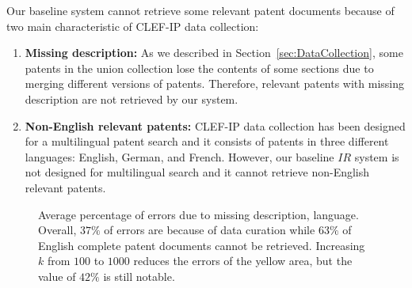 Our baseline system cannot retrieve some relevant patent documents because of two main characteristic of CLEF-IP data collection: 
\begin{enumerate}

\item \textbf{Missing description: } As we described in Section~\ref{sec:DataCollection}, some patents in the union collection lose the contents of some sections due to merging different versions of patents. Therefore, relevant patents with missing description are not retrieved by our system.
\item \textbf{Non-English relevant patents: } CLEF-IP data collection has been designed for a multilingual patent search and it consists of patents in three different languages: English, German, and French. However, our baseline $\mathit{IR}$ system is not designed for multilingual search and it cannot retrieve non-English relevant patents.   
\end{enumerate}
\begin{figure}[t!]
\begin{centering}
\par\end{centering} 
\protect\caption{Average percentage of errors due to missing description, language. Overall, $37\%$ of errors are because of data curation while $63\%$ of English complete patent documents cannot be retrieved. Increasing $k$ from $100$ to $1000$ reduces the errors of the yellow area, but the value of $42\%$ is still notable.}
\label{fig:datacuration}
\end{figure}
